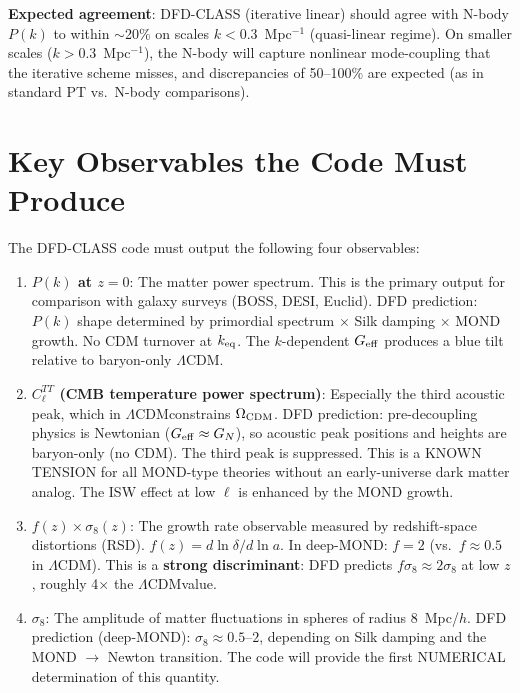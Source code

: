 \documentclass[11pt]{article}
\theoremstyle{definition}
\theoremstyle{remark}
\newcommand{\Geff}{G_{\rm eff}}
\newcommand{\LCDM}{$\Lambda$CDM}
\begin{document}
\textbf{Expected agreement}: DFD-CLASS (iterative linear) should agree
with N-body $P(k)$ to within $\sim$20\% on scales $k < 0.3$~Mpc$^{-1}$
(quasi-linear regime). On smaller scales ($k > 0.3$~Mpc$^{-1}$), the
N-body will capture nonlinear mode-coupling that the iterative scheme
misses, and discrepancies of 50--100\% are expected (as in standard
PT vs.\ N-body comparisons).


\section{Key Observables the Code Must Produce}
\label{sec:observables}

The DFD-CLASS code must output the following four observables:

\begin{enumerate}
\item \textbf{$P(k)$ at $z = 0$}: The matter power spectrum. This is the
  primary output for comparison with galaxy surveys (BOSS, DESI, Euclid).
  DFD prediction: $P(k)$ shape determined by primordial spectrum $\times$
  Silk damping $\times$ MOND growth. No CDM turnover at $k_{\rm eq}$.
  The $k$-dependent $\Geff$ produces a blue tilt relative to baryon-only
  \LCDM.

\item \textbf{$C_\ell^{TT}$ (CMB temperature power spectrum)}: Especially
  the third acoustic peak, which in \LCDM constrains $\Omega_{\rm CDM}$.
  DFD prediction: pre-decoupling physics is Newtonian ($\Geff \approx G_N$),
  so acoustic peak positions and heights are baryon-only (no CDM).
  The third peak is suppressed. This is a KNOWN TENSION for all
  MOND-type theories without an early-universe dark matter analog.
  The ISW effect at low $\ell$ is enhanced by the MOND growth.

\item \textbf{$f(z) \times \sigma_8(z)$}: The growth rate observable
  measured by redshift-space distortions (RSD). $f(z) = d\ln\delta/d\ln a$.
  In deep-MOND: $f = 2$ (vs.\ $f \approx 0.5$ in \LCDM). This is a
  \textbf{strong discriminant}: DFD predicts $f\sigma_8 \approx 2\sigma_8$
  at low $z$, roughly 4$\times$ the \LCDM value.

\item \textbf{$\sigma_8$}: The amplitude of matter fluctuations in
  spheres of radius 8~Mpc/$h$. DFD prediction (deep-MOND): $\sigma_8 \approx
  0.5$--$2$, depending on Silk damping and the MOND $\to$ Newton transition.
  The code will provide the first NUMERICAL determination of this quantity.
\end{enumerate}
\end{document}
